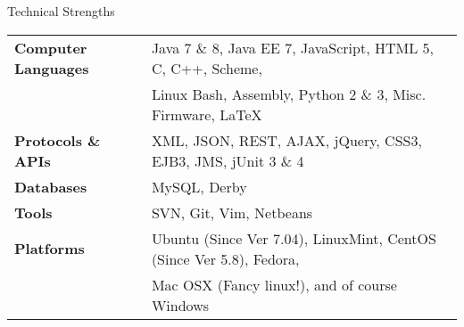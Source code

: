 \documentclass{resume} %
\begin{document}

\begin{rSection}{Technical Strengths}

\begin{tabular}{ @{} >{\bfseries}l @{\hspace{6ex}} l }
Computer Languages & Java 7 \& 8, Java EE 7, JavaScript,  HTML 5, C, C++,  Scheme,\\
 &  Linux Bash, Assembly, Python 2 \& 3, Misc. Firmware, \LaTeX \\
Protocols \& APIs & XML, JSON,  REST, AJAX, jQuery, CSS3, EJB3, JMS, jUnit 3 \& 4 \\
Databases & MySQL, Derby \\
Tools & SVN, Git, Vim, Netbeans \\
Platforms & Ubuntu (Since Ver 7.04), LinuxMint, CentOS (Since Ver 5.8), Fedora, \\
 & Mac OSX (Fancy linux!), and of course Windows \\
\end{tabular}

\end{rSection}





\end{document}
